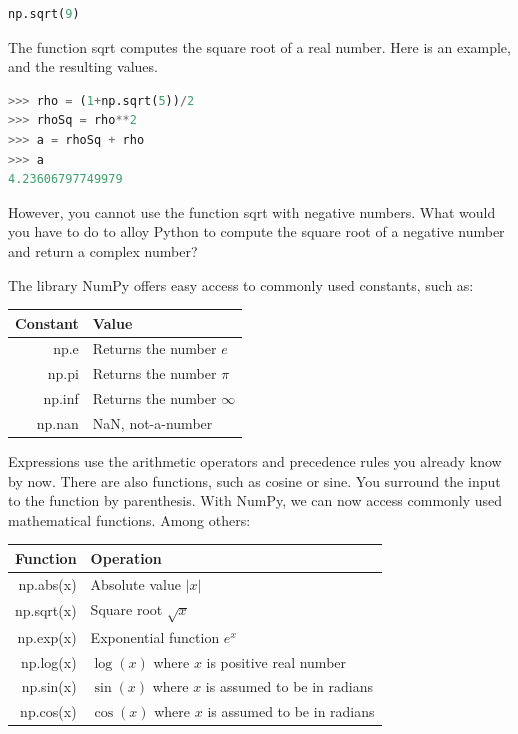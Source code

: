 \begin{lstlisting}[language=Python]
	np.sqrt(9)  
\end{lstlisting}

The function {\s sqrt} computes the square root of a real number. Here is an example, and the resulting values.

\begin{lstlisting}[language=Python]
>>> rho = (1+np.sqrt(5))/2
>>> rhoSq = rho**2
>>> a = rhoSq + rho
>>> a
4.23606797749979
\end{lstlisting}

However, you cannot use the function {\s sqrt} with negative numbers. What would you have to do to alloy Python to compute the square root of a negative number and return a complex number? \QA  %


The library NumPy offers easy access to commonly used constants, such as:

\vs 

\begin{tabular}{r|l}
Constant 		& Value\\
\hline
{\s np.e} 		& Returns the number $e$ \\
{\s np.pi} 		& Returns the number $\pi$ \\
{\s np.inf} 	& Returns the number $\infty$ \\
{\s np.nan} 	& NaN, not-a-number \\
\hline
\end{tabular}

\vs



Expressions use the arithmetic operators and precedence rules you already know by now. There are also functions, such as cosine or sine. You surround the input to the function by parenthesis.  With NumPy, we can now access commonly used mathematical functions. Among others: \vs

\begin{tabular}{r|l}
Function 			& Operation \\
\hline
{\s np.abs(x)} 		& Absolute value $|x|$ \\
{\s np.sqrt(x)}		&  Square root $\sqrt{x}$ \\
{\s np.exp(x)} 		& Exponential function $e^x$ \\
{\s np.log(x)} 		& $\log(x)$ where $x$ is positive real number\\
{\s np.sin(x)}		&  $\sin(x)$ where $x$ is assumed to be in radians \\
{\s np.cos(x)}		& $\cos(x)$ where $x$ is assumed to be in radians \\
\hline
\end{tabular}

